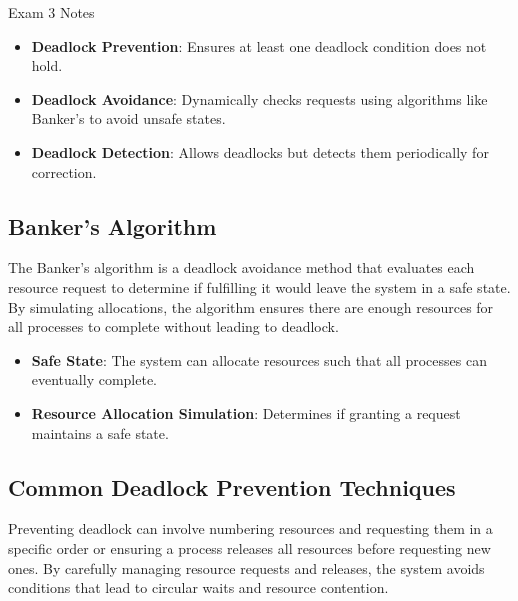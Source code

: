 \begin{examnotes}{Exam 3 Notes}
    \begin{highlight}
        \begin{itemize}
            \item \textbf{Deadlock Prevention}: Ensures at least one deadlock condition does not hold.
            \item \textbf{Deadlock Avoidance}: Dynamically checks requests using algorithms like Banker's to avoid unsafe states.
            \item \textbf{Deadlock Detection}: Allows deadlocks but detects them periodically for correction.
        \end{itemize}
    \end{highlight}
    
    \subsection*{Banker's Algorithm}
    
    The Banker's algorithm is a deadlock avoidance method that evaluates each resource request to determine if fulfilling it would leave the system in a safe state. By simulating allocations, the 
    algorithm ensures there are enough resources for all processes to complete without leading to deadlock.
    
    \begin{highlight}
        \begin{itemize}
            \item \textbf{Safe State}: The system can allocate resources such that all processes can eventually complete.
            \item \textbf{Resource Allocation Simulation}: Determines if granting a request maintains a safe state.
        \end{itemize}
    \end{highlight}
    
    \subsection*{Common Deadlock Prevention Techniques}
    
    Preventing deadlock can involve numbering resources and requesting them in a specific order or ensuring a process releases all resources before requesting new ones. By carefully managing resource 
    requests and releases, the system avoids conditions that lead to circular waits and resource contention.
    

\end{examnotes}
